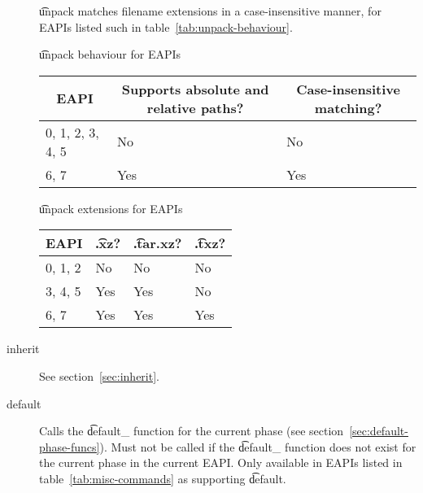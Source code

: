 \begin{description}
     \t{unpack} matches filename extensions in a case-insensitive
    manner, for EAPIs listed such in table~\ref{tab:unpack-behaviour}.

    \begin{centertable}{\t{unpack} behaviour for EAPIs}
        \label{tab:unpack-behaviour}
        \begin{tabular}{lll}
          \toprule
          \multicolumn{1}{c}{\textbf{EAPI}} &
          \multicolumn{1}{c}{\textbf{Supports absolute and relative paths?}} &
          \multicolumn{1}{c}{\textbf{Case-insensitive matching?}} \\
          \midrule
          0, 1, 2, 3, 4, 5  & No  & No  \\
          6, 7              & Yes & Yes \\
          \bottomrule
        \end{tabular}
    \end{centertable}

    \begin{centertable}{\t{unpack} extensions for EAPIs}
        \label{tab:unpack-extensions-table}
        \begin{tabular}{llll}
          \toprule
          \multicolumn{1}{c}{\textbf{EAPI}} &
          \multicolumn{1}{c}{\textbf{\t{.xz}?}} &
          \multicolumn{1}{c}{\textbf{\t{.tar.xz}?}} &
          \multicolumn{1}{c}{\textbf{\t{.txz}?}} \\
          \midrule
          0, 1, 2           & No  & No  & No  \\
          3, 4, 5           & Yes & Yes & No  \\
          6, 7              & Yes & Yes & Yes \\
          \bottomrule
        \end{tabular}
    \end{centertable}

\item[inherit] See section~\ref{sec:inherit}.

\item[default]
     Calls the \t{default_} function for the current phase (see
    section~\ref{sec:default-phase-funcs}). Must not be called if the \t{default_} function does
    not exist for the current phase in the current EAPI\@. Only available in EAPIs listed in
    table~\ref{tab:misc-commands} as supporting \t{default}.


\end{description}
